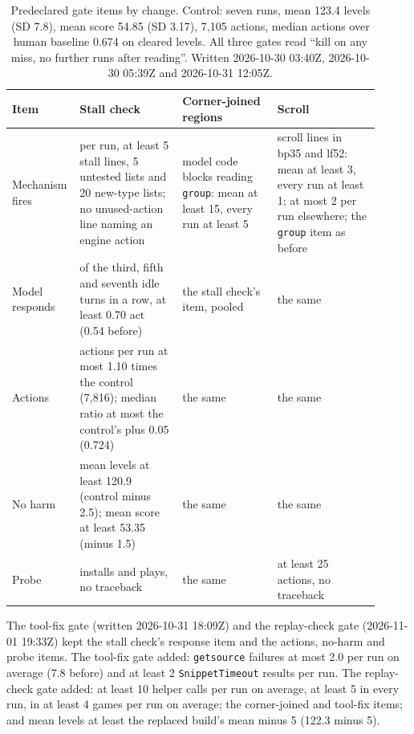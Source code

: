 \begin{table}[!htb]
\caption{Predeclared gate items by change. Control: seven runs, mean 123.4 levels (SD 7.8), mean score 54.85 (SD 3.17), 7,105 actions, median actions over human baseline 0.674 on cleared levels. All three gates read ``kill on any miss, no further runs after reading''. Written 2026-10-30 03:40Z, 2026-10-30 05:39Z and 2026-10-31 12:05Z.}\label{tab:harnessgate} %
\centering\footnotesize
\setlength{\tabcolsep}{3pt}
\begin{tabular}{@{}>{\raggedright\arraybackslash}p{0.12\linewidth}>{\raggedright\arraybackslash}p{0.27\linewidth}>{\raggedright\arraybackslash}p{0.25\linewidth}>{\raggedright\arraybackslash}p{0.27\linewidth}@{}}
\toprule
Item & Stall check & Corner-joined regions & Scroll \\
\midrule
Mechanism fires & per run, at least 5 stall lines, 5 untested lists and 20 new-type lists; no unused-action line naming an engine action & model code blocks reading \texttt{group}: mean at least 15, every run at least 5 & scroll lines in bp35 and lf52: mean at least 3, every run at least 1; at most 2 per run elsewhere; the \texttt{group} item as before \\
Model responds & of the third, fifth and seventh idle turns in a row, at least 0.70 act (0.54 before) & the stall check's item, pooled & the same \\
Actions & actions per run at most 1.10 times the control (7,816); median ratio at most the control's plus 0.05 (0.724) & the same & the same \\
No harm & mean levels at least 120.9 (control minus 2.5); mean score at least 53.35 (minus 1.5) & the same & the same \\
Probe & installs and plays, no traceback & the same & at least 25 actions, no traceback \\
\bottomrule
\end{tabular}
\end{table}

The tool-fix gate (written 2026-10-31 18:09Z) and the replay-check gate (2026-11-01 19:33Z) kept the stall check's response item and the actions, no-harm and probe items. The tool-fix gate added: \texttt{getsource} failures at most 2.0 per run on average (7.8 before) and at least 2 \texttt{SnippetTimeout} results per run. The replay-check gate added: at least 10 helper calls per run on average, at least 5 in every run, in at least 4 games per run on average; the corner-joined and tool-fix items; and mean levels at least the replaced build's mean minus 5 (122.3 minus 5). %

